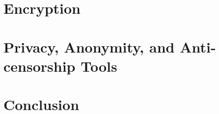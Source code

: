 \documentclass[12pt]{article} %
\begin{document}
\section{Encryption}
\label{sec:Encryption}



\section{Privacy, Anonymity, and Anti-censorship Tools}
\label{sec:Tools}



\section{Conclusion} %
\label{sec:Conclusion}



\end{document}

